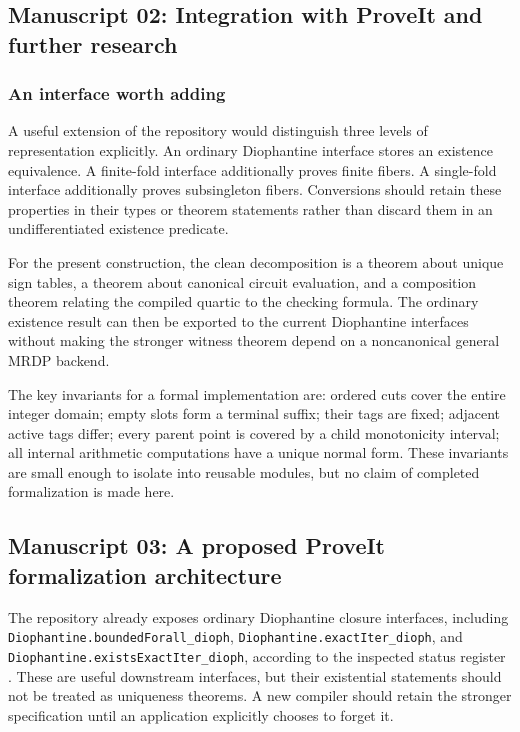 \documentclass[11pt,a4paper]{article}
\theoremstyle{definition}
\theoremstyle{remark}
\newcommand{\repo}[1]{\nolinkurl{#1}}
\begin{document}
\subsection{Manuscript 02: Integration with ProveIt and further research}
\label{cdc:pt:sec:agenda}

\subsubsection{An interface worth adding}
A useful extension of the repository would distinguish three levels of
representation explicitly. An ordinary Diophantine interface stores an
existence equivalence. A finite-fold interface additionally proves finite
fibers. A single-fold interface additionally proves subsingleton fibers.
Conversions should retain these properties in their types or theorem
statements rather than discard them in an undifferentiated existence
predicate.

For the present construction, the clean decomposition is a theorem about
unique sign tables, a theorem about canonical circuit evaluation, and a
composition theorem relating the compiled quartic to the checking formula.
The ordinary existence result can then be exported to the current
Diophantine interfaces without making the stronger witness theorem depend
on a noncanonical general MRDP backend.

The key invariants for a formal implementation are: ordered cuts cover the
entire integer domain; empty slots form a terminal suffix; their tags are
fixed; adjacent active tags differ; every parent point is covered by a
child monotonicity interval; all internal arithmetic computations have a
unique normal form. These invariants are small enough to isolate into
reusable modules, but no claim of completed formalization is made here.


\subsection{Manuscript 03: A proposed ProveIt formalization architecture}\label{cdc:mem:sec:formalization}
The repository already exposes ordinary Diophantine closure interfaces, including
\repo{Diophantine.boundedForall_dioph}, \repo{Diophantine.exactIter_dioph}, and
\repo{Diophantine.existsExactIter_dioph}, according to the inspected status
register \cite{repo-status}. These are useful downstream interfaces, but their
existential statements should not be treated as uniqueness theorems.
A new compiler should retain the stronger specification until an application
explicitly chooses to forget it.
\end{document}
